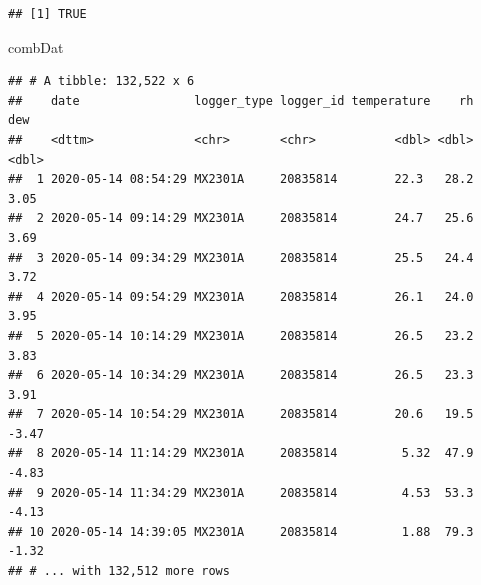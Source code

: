 \documentclass[]{article}
\newenvironment{Shaded}{\begin{snugshade}}{\end{snugshade}}
\newcommand{\DataTypeTok}[1]{\textcolor[rgb]{0.13,0.29,0.53}{#1}}
\newcommand{\KeywordTok}[1]{\textcolor[rgb]{0.13,0.29,0.53}{\textbf{#1}}}
\newcommand{\NormalTok}[1]{#1}
\newcommand{\OperatorTok}[1]{\textcolor[rgb]{0.81,0.36,0.00}{\textbf{#1}}}
\newcommand{\StringTok}[1]{\textcolor[rgb]{0.31,0.60,0.02}{#1}}
\begin{document}
\begin{verbatim}
## [1] TRUE
\end{verbatim}

\begin{Shaded}
\end{Shaded}

\begin{Shaded}
\begin{Highlighting}[]
\NormalTok{combDat}
\end{Highlighting}
\end{Shaded}

\begin{verbatim}
## # A tibble: 132,522 x 6
##    date                logger_type logger_id temperature    rh   dew
##    <dttm>              <chr>       <chr>           <dbl> <dbl> <dbl>
##  1 2020-05-14 08:54:29 MX2301A     20835814        22.3   28.2  3.05
##  2 2020-05-14 09:14:29 MX2301A     20835814        24.7   25.6  3.69
##  3 2020-05-14 09:34:29 MX2301A     20835814        25.5   24.4  3.72
##  4 2020-05-14 09:54:29 MX2301A     20835814        26.1   24.0  3.95
##  5 2020-05-14 10:14:29 MX2301A     20835814        26.5   23.2  3.83
##  6 2020-05-14 10:34:29 MX2301A     20835814        26.5   23.3  3.91
##  7 2020-05-14 10:54:29 MX2301A     20835814        20.6   19.5 -3.47
##  8 2020-05-14 11:14:29 MX2301A     20835814         5.32  47.9 -4.83
##  9 2020-05-14 11:34:29 MX2301A     20835814         4.53  53.3 -4.13
## 10 2020-05-14 14:39:05 MX2301A     20835814         1.88  79.3 -1.32
## # ... with 132,512 more rows
\end{verbatim}
\end{document}
